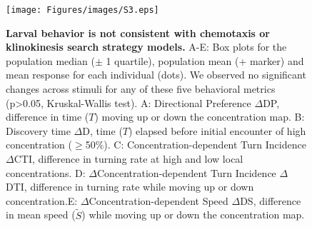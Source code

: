 \clearpage 
\begin{figure}[t!]
  \texttt{[image: Figures/images/S3.eps]}
  \caption{\textbf{Larval behavior is not consistent with chemotaxis or klinokinesis search strategy models.} A-E: Box plots for the population median (${\pm}$ 1 quartile), population mean (+ marker) and mean response for each individual (dots). We observed no significant changes across stimuli for any of these five behavioral metrics (p>0.05, Kruskal-Wallis test). A: Directional Preference ${\Delta}$DP, difference in time (${T}$) moving up or down the concentration map. B: Discovery time ${\Delta}$D, time (${T}$) elapsed before initial encounter of high concentration (${\geq}$50${\%}$). C: Concentration-dependent Turn Incidence ${\Delta}$CTI, difference in turning rate at high and low local concentrations. D: ${\Delta}$Concentration-dependent Turn Incidence ${\Delta}$DTI, difference in turning rate while moving up or down concentration.E: ${\Delta}$Concentration-dependent Speed ${\Delta}$DS, difference in mean speed (${\tilde{S}}$) while moving up or down the concentration map.}
\end{figure}
